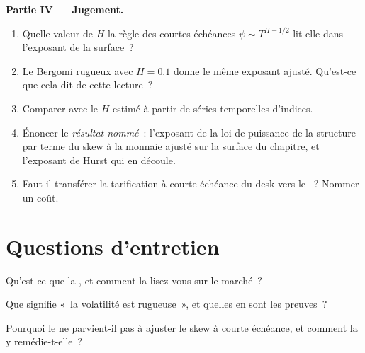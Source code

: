 \begin{problem}
\medskip\noindent\textbf{Partie IV --- Jugement.}
\begin{enumerate}[resume]
\item Quelle valeur de $H$ la règle des courtes échéances $\psi\sim T^{H-1/2}$ lit-elle dans l'exposant de la surface~?
\item Le Bergomi rugueux avec $H=0.1$ donne le même exposant ajusté. Qu'est-ce que cela dit de cette lecture~?
\item Comparer avec le $H$ estimé à partir de séries temporelles d'indices.
\item Énoncer le \emph{résultat nommé}~: l'exposant de la loi de puissance de la structure par terme du skew à la monnaie ajusté sur la
surface du chapitre, et l'exposant de Hurst qui en découle.
\item Faut-il transférer la tarification à courte échéance du desk vers le ~? Nommer un coût.
\end{enumerate}
\end{problem}

\section{Questions d'entretien}

\begin{interviewq}\label{iq:dv:rough-volatility-and-forward-variance-models:1}
Qu'est-ce que la , et comment la lisez-vous sur le marché~?
\end{interviewq}

\begin{interviewq}\label{iq:dv:rough-volatility-and-forward-variance-models:2}
Que signifie «~la volatilité est rugueuse~», et quelles en sont les preuves~?
\end{interviewq}

\begin{interviewq}\label{iq:dv:rough-volatility-and-forward-variance-models:3}
Pourquoi le  ne parvient-il pas à ajuster le skew à courte échéance, et comment la  y remédie-t-elle~?
\end{interviewq}

